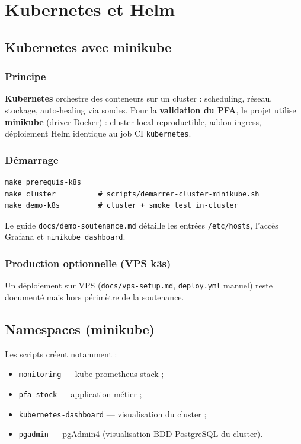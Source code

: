 \chapter{Kubernetes et Helm}
\label{ch:k8s}

\section{Kubernetes avec minikube}

\subsection{Principe}

\textbf{Kubernetes} orchestre des conteneurs sur un cluster : scheduling, réseau, stockage, auto-healing via sondes. Pour la \textbf{validation du PFA}, le projet utilise \textbf{minikube} (driver Docker) : cluster local reproductible, addon ingress, déploiement Helm identique au job CI \texttt{kubernetes}.

\subsection{Démarrage}

\begin{lstlisting}[style=bash]
make prerequis-k8s
make cluster          # scripts/demarrer-cluster-minikube.sh
make demo-k8s         # cluster + smoke test in-cluster
\end{lstlisting}

Le guide \texttt{docs/demo-soutenance.md} détaille les entrées \texttt{/etc/hosts}, l'accès Grafana et \texttt{minikube dashboard}.

\subsection{Production optionnelle (VPS k3s)}

Un déploiement sur VPS (\texttt{docs/vps-setup.md}, \texttt{deploy.yml} manuel) reste documenté mais hors périmètre de la soutenance.

\section{Namespaces (minikube)}

Les scripts créent notamment :
\begin{itemize}
  \item \texttt{monitoring} — kube-prometheus-stack ;
  \item \texttt{pfa-stock} — application métier ;
  \item \texttt{kubernetes-dashboard} — visualisation du cluster ;
  \item \texttt{pgadmin} — pgAdmin4 (visualisation BDD PostgreSQL du cluster).
\end{itemize}

